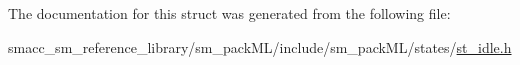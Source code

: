 The documentation for this struct was generated from the following file\+:\begin{DoxyCompactItemize}
\item 
smacc\+\_\+sm\+\_\+reference\+\_\+library/sm\+\_\+pack\+M\+L/include/sm\+\_\+pack\+M\+L/states/\hyperlink{sm__packML_2include_2sm__packML_2states_2st__idle_8h}{st\+\_\+idle.\+h}\end{DoxyCompactItemize}
